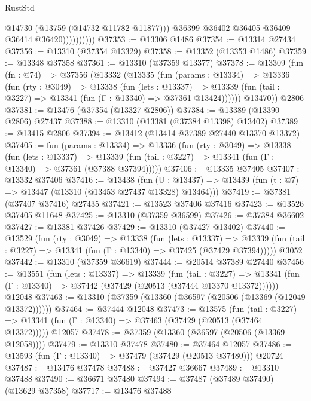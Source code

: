 \begin{lexlean}{RustStd}
\begin{coremodule}
                          @14730
                          (@13759 (@14732 @11782 @11877)))
                        @36399
                        @36402
                        @36405
                        @36409
                        @36414
                        @36420))))))))))
@37353 := @13306 @1486
@37354 := @13314 @27434
@37356 := @13310 (@37354 @13329)
@37358 := @13352 (@13353 @1486)
@37359 := @13348 @37358
@37361 := @13310 (@37359 @13377)
@37378 := @13309
    (fun (fn : @74) =>
    @37356
      (@13332
        (@13335
          (fun (params : @13334) =>
          @13336
            (fun (rty : @3049) =>
            @13338
              (fun (lets : @13337) =>
              @13339 (fun (tail : @3227) => @13341 (fun (Γ : @13340) => @37361 @13424))))))
        @13470))
    @2806
@37381 := @13476 (@37354 (@13327 @2806))
@37384 := @13389 (@13390 @2806) @27437
@37388 := @13310 (@13381 (@37384 @13398) @13402)
@37389 := @13415 @2806
@37394 := @13412 (@13414 @37389 @27440 @13370 @13372)
@37405 := fun (params : @13334) =>
  @13336
    (fun (rty : @3049) =>
    @13338
      (fun (lets : @13337) =>
      @13339 (fun (tail : @3227) => @13341 (fun (Γ : @13340) => @37361 (@37388 @37394)))))
@37406 := @13335 @37405
@37407 := @13332 @37406
@37416 := @13438
    (fun (U : @13437) => @13439 (fun (t : @7) => @13447 (@13310 (@13453 @27437 @13328) @13464)))
@37419 := @37381 (@37407 @37416) @27435
@37421 := @13523 @37406 @37416
@37423 := @13526 @37405 @11648
@37425 := @13310 (@37359 @36599)
@37426 := @37384 @36602
@37427 := @13381 @37426
@37429 := @13310 (@37427 @13402)
@37440 := @13529
    (fun (rty : @3049) =>
    @13338
      (fun (lets : @13337) =>
      @13339 (fun (tail : @3227) => @13341 (fun (Γ : @13340) => @37425 (@37429 @37394)))))
    @3052
@37442 := @13310 (@37359 @36619)
@37444 := @20514 @37389 @27440
@37456 := @13551
    (fun (lets : @13337) =>
    @13339
      (fun (tail : @3227) =>
      @13341 (fun (Γ : @13340) => @37442 (@37429 (@20513 (@37444 @13370 @13372))))))
    @12048
@37463 := @13310 (@37359 (@13360 (@36597 (@20506 (@13369 (@12049 @13372))))))
@37464 := @37444 @12048
@37473 := @13575
    (fun (tail : @3227) => @13341 (fun (Γ : @13340) => @37463 (@37429 (@20513 (@37464 @13372)))))
    @12057
@37478 := @37359 (@13360 (@36597 (@20506 (@13369 @12058))))
@37479 := @13310 @37478
@37480 := @37464 @12057
@37486 := @13593 (fun (Γ : @13340) => @37479 (@37429 (@20513 @37480))) @20724
@37487 := @13476 @37478
@37488 := @37427 @36667
@37489 := @13310 @37488
@37490 := @36671 @37480
@37494 := @37487 (@37489 @37490) (@13629 @37358)
@37717 := @13476
    @37488

\end{coremodule}
\end{lexlean}
